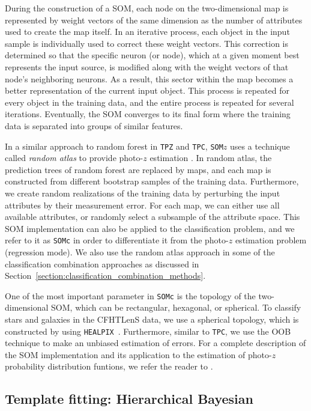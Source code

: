 \documentclass[useAMS,usenatbib]{mn2e}
\begin{document}
During the construction of a SOM,
each node on the two-dimensional map is represented by
weight vectors of the same dimension
as the number of attributes used to create the map itself.
In an iterative process,
each object in the input sample is individually used
to correct these weight vectors.
This correction is determined so that the specific neuron (or node),
which at a given moment best represents the input source,
is modified along with the weight vectors
of that node's neighboring neurons.
As a result, this sector within the map
becomes a better representation of the current input object.
This process is repeated for every object in the training data,
and the entire process is repeated for several iterations.
Eventually, the SOM converges to its final form where
the training data is separated into groups of similar features.

In a similar approach to random forest in \texttt{TPZ} and \texttt{TPC},
\texttt{SOM}$z$ uses a technique called \textit{random atlas}
to provide photo-$z$ estimation \citep{carrascokind2014somz}.
In random atlas, the prediction trees of random forest are replaced by maps,
and each map is constructed from different bootstrap samples
of the training data.
Furthermore, we create random realizations of the training data
by perturbing the input attributes by their measurement error.
For each map, we can either use all available attributes,
or randomly select a subsample of the attribute space.
This SOM implementation can also be
applied to the classification problem,
and we refer to it as \texttt{SOMc}
in order to differentiate it from 
the photo-$z$ estimation problem (regression mode).
We also use the random atlas approach
in some of the classification combination approaches as discussed in
Section~\ref{section:classification_combination_methods}.

One of the most important parameter in \texttt{SOMc}
is the topology of the two-dimensional SOM,
which can be rectangular, hexagonal, or spherical.
To classify stars and galaxies in the CFHTLenS data,
we use a spherical topology,
which is constructed by using
\texttt{HEALPIX}~\citep{gorski2005healpix}.
Furthermore, similar to \texttt{TPC},
we use the OOB technique to make an unbiased estimation of errors.
For a complete description of the SOM implementation
and its application to the estimation of
photo-$z$ probability distribution funtions,
we refer the reader to \cite{carrascokind2014somz}.

\subsection{Template fitting: Hierarchical Bayesian}
\end{document}
